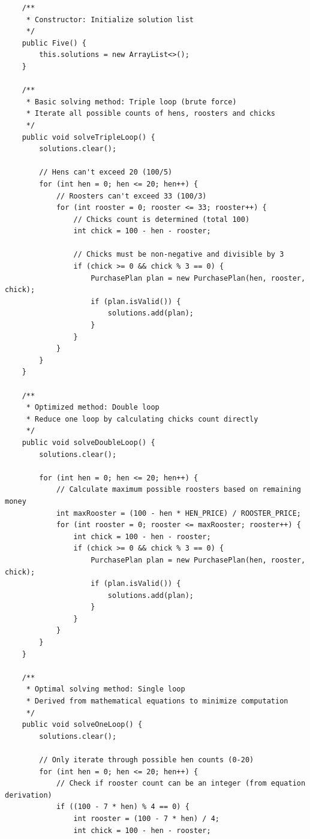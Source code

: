 \documentclass[12pt,a4paper]{article}
\begin{document}
\begin{lstlisting}
    /**
     * Constructor: Initialize solution list
     */
    public Five() {
        this.solutions = new ArrayList<>();
    }

    /**
     * Basic solving method: Triple loop (brute force)
     * Iterate all possible counts of hens, roosters and chicks
     */
    public void solveTripleLoop() {
        solutions.clear();
        
        // Hens can't exceed 20 (100/5)
        for (int hen = 0; hen <= 20; hen++) {
            // Roosters can't exceed 33 (100/3)
            for (int rooster = 0; rooster <= 33; rooster++) {
                // Chicks count is determined (total 100)
                int chick = 100 - hen - rooster;
                
                // Chicks must be non-negative and divisible by 3
                if (chick >= 0 && chick % 3 == 0) {
                    PurchasePlan plan = new PurchasePlan(hen, rooster, chick);
                    if (plan.isValid()) {
                        solutions.add(plan);
                    }
                }
            }
        }
    }
    
    /**
     * Optimized method: Double loop
     * Reduce one loop by calculating chicks count directly
     */
    public void solveDoubleLoop() {
        solutions.clear();
        
        for (int hen = 0; hen <= 20; hen++) {
            // Calculate maximum possible roosters based on remaining money
            int maxRooster = (100 - hen * HEN_PRICE) / ROOSTER_PRICE;
            for (int rooster = 0; rooster <= maxRooster; rooster++) {
                int chick = 100 - hen - rooster;
                if (chick >= 0 && chick % 3 == 0) {
                    PurchasePlan plan = new PurchasePlan(hen, rooster, chick);
                    if (plan.isValid()) {
                        solutions.add(plan);
                    }
                }
            }
        }
    }
    
    /**
     * Optimal solving method: Single loop
     * Derived from mathematical equations to minimize computation
     */
    public void solveOneLoop() {
        solutions.clear();
        
        // Only iterate through possible hen counts (0-20)
        for (int hen = 0; hen <= 20; hen++) {
            // Check if rooster count can be an integer (from equation derivation)
            if ((100 - 7 * hen) % 4 == 0) {
                int rooster = (100 - 7 * hen) / 4;
                int chick = 100 - hen - rooster;
                

\end{lstlisting}
\end{document}
